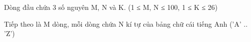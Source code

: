 Dòng đầu chứa 3 số nguyên M, N và K. (1 ≤ M, N ≤ 100, 1 ≤ K ≤ 26)  

   Tiếp theo là M dòng, mỗi dòng chứa N kí tự của bảng chữ cái tiếng Anh ('A' .. 'Z')  

\